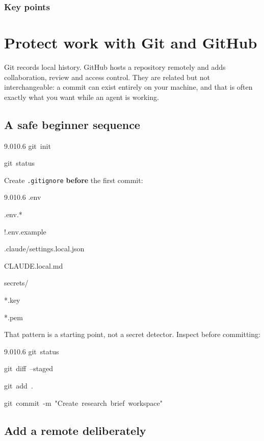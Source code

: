 \documentclass[11pt,a4paper,twoside,openany]{book}
\newcommand{\chaptertitlelabel}{}
\newcommand{\cl}[1]{\noindent\mbox{#1}\par}
\begin{document}
  \subsection*{Key points}
  \begin{itemize}\kprows\end{itemize}
\else
  \noindent\kpbody
\fi
\par\addvspace{1.4mm}
\endgroup

\FloatBarrier
\renewcommand{\chaptertitlelabel}{Part II \textperiodcentered\ Chapter 8}
\setcounter{chapter}{7}
\chapter{Protect work with Git and GitHub}

Git records local history. GitHub hosts a repository remotely and adds collaboration, review and access control. They are related but not interchangeable: a commit can exist entirely on your machine, and that is often exactly what you want while an agent is working.


\FloatBarrier
\setcounter{section}{0}
\section{A safe beginner sequence}

\begin{codeblock}{9.0}{10.6}
\cl{git~init}
\cl{git~status}
\end{codeblock}

Create \texttt{.\allowbreak{}gitignore} \textbf{before} the first commit:


\begin{codeblock}{9.0}{10.6}
\cl{.env}
\cl{.env.*}
\cl{!.env.example}
\cl{.claude/settings.local.json}
\cl{CLAUDE.local.md}
\cl{secrets/}
\cl{*.key}
\cl{*.pem}
\end{codeblock}

That pattern is a starting point, not a secret detector. Inspect before committing:


\begin{codeblock}{9.0}{10.6}
\cl{git~status}
\cl{git~diff~--staged}
\cl{git~add~.}
\cl{git~commit~-m~"Create~research~brief~workspace"}
\end{codeblock}

\FloatBarrier
\setcounter{section}{1}
\section{Add a remote deliberately}
\end{document}
